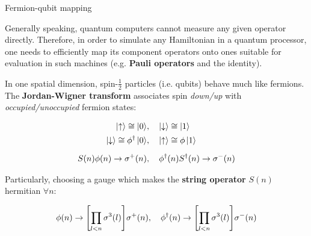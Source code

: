 \documentclass[9pt, aspectratio=169]{beamer}
\begin{document}
\begin{frame}{Fermion-qubit mapping}

	Generally speaking, quantum computers cannot measure any given operator directly. Therefore, in order to simulate any Hamiltonian in a quantum processor, one needs to efficiently map its component operators onto ones suitable for evaluation in such machines (e.g. \textbf{Pauli operators} and the identity).

	\medskip \pause

	In one spatial dimension, spin-$\frac{1}{2}$ particles (i.e. qubits) behave much like fermions. The \textbf{Jordan-Wigner transform} associates spin \emph{down/up} with \emph{occupied/unoccupied} fermion states:

	\begin{align*}
		\ket{\ua} \cong \ket{0} &\qc
			\ket{\da} \cong \ket{1} \\
    \ket{\da} \cong \phi^{\dagger}\ket{0} &\qc
			\ket{\ua} \cong \phi\ket{1} \\[5pt]
			S(n)\phi(n) \ra \sigma^{+}(n) &\qc
			\phi^{\dagger}(n)S^{\dagger}(n) \ra \sigma^{-}(n)
	\end{align*}

	\pause

	Particularly, choosing a gauge which makes the \textbf{string operator} $S(n)$ hermitian $\forall n$:

	\begin{gather*}
		\phi(n) \ra \qty[\prod_{l<n} \sigma^3(l)]\sigma^{+}(n) \qc
		\phi^{\dagger}(n) \ra \qty[\prod_{l<n} \sigma^3(l)]\sigma^{-}(n)
	\end{gather*}

\end{frame}

\end{document}
